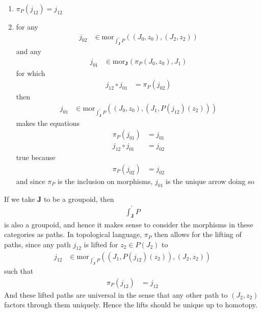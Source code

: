 \begin{enumerate}
\item[$\bullet$]
$\pi_{P}(j_{12}) = j_{12}$
\item[$\bullet$]
for any
\begin{align*}
  j_{02}
  &\in
  \mathrm{mor}_{\int_{\mathbf{J}}^{\prime}P}
  \left(
    (J_{0},z_{0}),
    (J_{2},z_{2})
  \right)
\end{align*}
and any
\begin{align*}
  j_{01}
  &\in
  \mathrm{mor}_{\mathbf{J}}
  \left(
    \pi_{P}(J_{0},z_{0}),
    J_{1}
  \right)
\end{align*}
for which
\begin{align*}
  j_{12}
  \circ
  j_{01}
  &=
  \pi_{P}(j_{02})
\end{align*}
then
\begin{align*}
  j_{01}
  &\in
  \mathrm{mor}_{\int_{\mathbf{J}}^{\prime}P}
  \left(
    (J_{0},z_{0}),
    (J_{1},P(j_{12})(z_{2}))
  \right)
\end{align*}
makes the equations
\begin{align*}
  \pi_{P}(j_{01})
  &=
  j_{01}
  \\
  j_{12}
  \circ
  j_{01}
  &=
  j_{02}
\end{align*}
true because
\begin{align*}
  \pi_{P}(j_{02})
  &=
  j_{02}
\end{align*}
and since $\pi_{P}$ is the inclusion on morphisms, $j_{01}$ is the unique arrow doing so
\end{enumerate}
If we take $\mathbf{J}$ to be a groupoid, then
\begin{align*}
  \int_{\mathbf{J}}^{\prime}
  P
\end{align*}
is also a groupoid, and hence it makes sense to consider the morphisms in these categories as paths.
In topological language, $\pi_{P}$ then allows for the lifting of paths, since any path $j_{12}$ is {\glqq}lifted{\grqq} for $z_{2} \in P(J_{2})$ to
\begin{align*}
  j_{12}
  &\in
  \mathrm{mor}_{\int_{\mathbf{J}}^{\prime}P}
  \left(
    \left(
      J_{1},
      P(j_{12})(z_{2})
    \right),
    (J_{2},z_{2})
  \right)
\end{align*}
such that
\begin{align*}
  \pi_{P}(j_{12})
  &=
  j_{12}
\end{align*}
And these lifted paths are universal in the sense that any other path to $(J_{2},z_{2})$ factors through them uniquely.
Hence the lifts should be unique up to homotopy.
